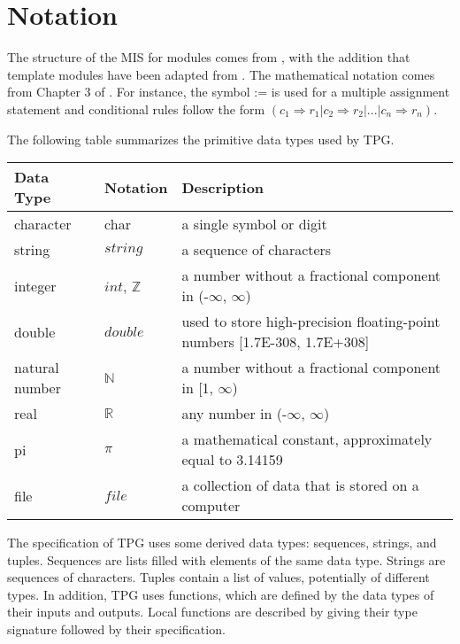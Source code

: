 \documentclass[12pt, titlepage]{article}
\begin{document}
\section{Notation}
The structure of the MIS for modules comes from \citet{HoffmanAndStrooper1995},
with the addition that template modules have been adapted from
\cite{GhezziEtAl2003}.  The mathematical notation comes from Chapter 3 of
\citet{HoffmanAndStrooper1995}.  For instance, the symbol := is used for a
multiple assignment statement and conditional rules follow the form $(c_1
\Rightarrow r_1 | c_2 \Rightarrow r_2 | ... | c_n \Rightarrow r_n )$.

The following table summarizes the primitive data types used by TPG. 

\begin{center}
\renewcommand{\arraystretch}{1.2}
\noindent 
\begin{tabular}{l l p{7.5cm}} 
\toprule 
\textbf{Data Type} & \textbf{Notation} & \textbf{Description}\\ 
\midrule
character & char & a single symbol or digit\\
string & $string$ & a sequence of characters \\
integer & $int$, $\mathbb{Z}$ & a number without a fractional component in (-$\infty$, $\infty$) \\
double & $double$ & used to store high-precision floating-point numbers [1.7E-308, 1.7E+308] \\
natural number & $\mathbb{N}$ & a number without a fractional component in [1, $\infty$) \\
real & $\mathbb{R}$ & any number in (-$\infty$, $\infty$)\\
pi & $\pi$ & a mathematical constant, approximately equal to 3.14159 \\
file & $file$ & a collection of data that is stored on a computer\\
\bottomrule
\end{tabular} 
\end{center}

\noindent
The specification of TPG uses some derived data types: sequences, strings, and
tuples. Sequences are lists filled with elements of the same data type. Strings
are sequences of characters. Tuples contain a list of values, potentially of
different types. In addition, TPG uses functions, which
are defined by the data types of their inputs and outputs. Local functions are
described by giving their type signature followed by their specification.
\end{document}
